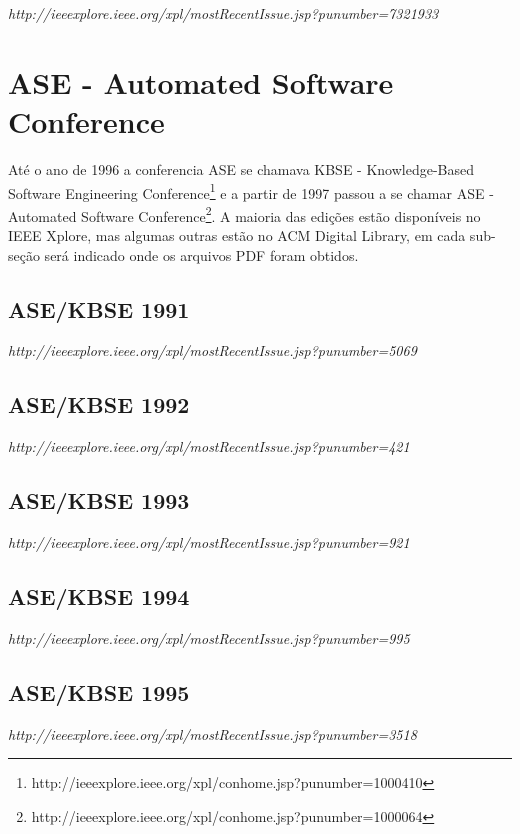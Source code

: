 {\small \em http://ieeexplore.ieee.org/xpl/mostRecentIssue.jsp?punumber=7321933}

\section{ASE - Automated Software Conference}

Até o ano de 1996 a conferencia ASE se chamava KBSE - Knowledge-Based Software
Engineering
Conference\footnote{http://ieeexplore.ieee.org/xpl/conhome.jsp?punumber=1000410}
e a partir de 1997 passou a se chamar ASE - Automated Software
Conference\footnote{http://ieeexplore.ieee.org/xpl/conhome.jsp?punumber=1000064}.
A maioria das edições estão disponíveis no IEEE Xplore, mas algumas outras
estão no ACM Digital Library, em cada sub-seção será indicado onde os arquivos
PDF foram obtidos.

\subsection{ASE/KBSE 1991}

{\small \em http://ieeexplore.ieee.org/xpl/mostRecentIssue.jsp?punumber=5069}

\subsection{ASE/KBSE 1992}

{\small \em http://ieeexplore.ieee.org/xpl/mostRecentIssue.jsp?punumber=421}

\subsection{ASE/KBSE 1993}

{\small \em http://ieeexplore.ieee.org/xpl/mostRecentIssue.jsp?punumber=921}

\subsection{ASE/KBSE 1994}

{\small \em http://ieeexplore.ieee.org/xpl/mostRecentIssue.jsp?punumber=995}

\subsection{ASE/KBSE 1995}

{\small \em http://ieeexplore.ieee.org/xpl/mostRecentIssue.jsp?punumber=3518}

